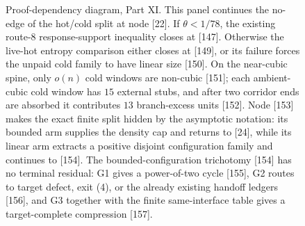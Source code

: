 \documentclass[11pt]{article}
\begin{document}
\begin{figure}[p]
{%
}
\caption[Proof-dependency diagram, Part XI]{Proof-dependency diagram, Part XI.  This panel continues the no-edge of the hot/cold split at node [22].  If \(\theta<1/78\), the existing route-8 response-support inequality closes at [147].  Otherwise the live-hot entropy comparison either closes at [149], or its failure forces the unpaid cold family to have linear size [150].  On the near-cubic spine, only \(o(n)\) cold windows are non-cubic [151]; each ambient-cubic cold window has \(15\) external stubs, and after two corridor ends are absorbed it contributes \(13\) branch-excess units [152].  Node [153] makes the exact finite split hidden by the asymptotic notation: its bounded arm supplies the density cap and returns to [24], while its linear arm extracts a positive disjoint configuration family and continues to [154].  The bounded-configuration trichotomy [154] has no terminal residual: G1 gives a power-of-two cycle [155], G2 routes to target defect, exit \textup{(4)}, or the already existing handoff ledgers [156], and G3 together with the finite same-interface table gives a target-complete compression [157].}
\label{fig:proof-diagram-part-xi}
\end{figure}
\end{document}

